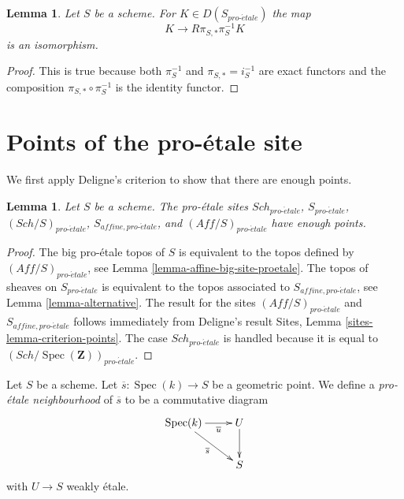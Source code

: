 \documentclass{stacks-project}
\theoremstyle{plain}
\newtheorem{lemma}[subsection]{Lemma}
\theoremstyle{definition}
\theoremstyle{remark}
\numberwithin{equation}{subsection}
\def\Spec{\mathop{\mathrm{Spec}}}
\def\Sch{\mathit{Sch}}
\def\proetale{{pro\text{-}\acute{e}tale}}
\begin{document}
\begin{lemma}
\label{lemma-cohomological-descent-proetale}
Let $S$ be a scheme. For $K \in D(S_\proetale)$ the map
$$
K \longrightarrow R\pi_{S, *}\pi_S^{-1}K
$$
is an isomorphism.
\end{lemma}

\begin{proof}
This is true because both $\pi_S^{-1}$ and $\pi_{S, *} = i_S^{-1}$
are exact functors and the composition $\pi_{S, *} \circ \pi_S^{-1}$
is the identity functor.
\end{proof}






















\section{Points of the pro-\'etale site}
\label{section-points}

\noindent
We first apply Deligne's criterion to show that there are enough points.

\begin{lemma}
\label{lemma-points-proetale}
Let $S$ be a scheme. The pro-\'etale sites $\Sch_\proetale$,
$S_\proetale$, $(\Sch/S)_\proetale$, $S_{affine, \proetale}$, and
$(\textit{Aff}/S)_\proetale$ have enough points.
\end{lemma}

\begin{proof}
The big pro-\'etale topos of $S$ is equivalent to the topos defined by
$(\textit{Aff}/S)_\proetale$, see
Lemma \ref{lemma-affine-big-site-proetale}.
The topos of sheaves on $S_\proetale$ is equivalent to the topos
associated to $S_{affine, \proetale}$, see
Lemma \ref{lemma-alternative}.
The result for the sites $(\textit{Aff}/S)_\proetale$ and
$S_{affine, \proetale}$ follows immediately from Deligne's result
Sites, Lemma \ref{sites-lemma-criterion-points}.
The case $\Sch_\proetale$ is handled because it is equal to
$(\Sch/\Spec(\mathbf{Z}))_\proetale$.
\end{proof}

\noindent
Let $S$ be a scheme. Let $\overline{s} : \Spec(k) \to S$ be a geometric
point. We define a {\it pro-\'etale neighbourhood} of $\overline{s}$
to be a commutative diagram
$$
\xymatrix{
\Spec(k) \ar[r]_-{\overline{u}} \ar[rd]_{\overline{s}} & U \ar[d] \\
& S
}
$$
with $U \to S$ weakly \'etale.
\end{document}
